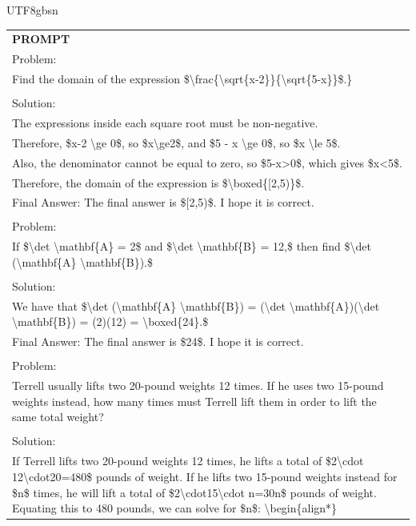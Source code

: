 \documentclass[11pt, a4paper, logo, copyright, nonumbering]{deepseek}
\begin{document}
\begin{CJK*}{UTF8}{gbsn}
\begin{table}[ht]
    \centering \small
\begin{tabular}{p{12cm}}
\toprule
\textbf{PROMPT}\\
Problem:
\\Find the domain of the expression \$\textbackslash frac\{\textbackslash sqrt\{x-2\}\}\{\textbackslash sqrt\{5-x\}\}\$.\}
\\
\\Solution:
\\The expressions inside each square root must be non-negative.
\\Therefore, \$x-2 \textbackslash ge 0\$, so \$x\textbackslash ge2\$, and \$5 - x \textbackslash ge 0\$, so \$x \textbackslash le 5\$.
\\Also, the denominator cannot be equal to zero, so \$5-x>0\$, which gives \$x<5\$.
\\Therefore, the domain of the expression is \$\textbackslash boxed\{[2,5)\}\$.
\\Final Answer: The final answer is \$[2,5)\$. I hope it is correct.
\\
\\Problem:
\\If \$\textbackslash det \textbackslash mathbf\{A\} = 2\$ and \$\textbackslash det \textbackslash mathbf\{B\} = 12,\$ then find \$\textbackslash det (\textbackslash mathbf\{A\} \textbackslash mathbf\{B\}).\$
\\
\\Solution:
\\We have that \$\textbackslash det (\textbackslash mathbf\{A\} \textbackslash mathbf\{B\}) = (\textbackslash det \textbackslash mathbf\{A\})(\textbackslash det \textbackslash mathbf\{B\}) = (2)(12) = \textbackslash boxed\{24\}.\$
\\Final Answer: The final answer is \$24\$. I hope it is correct.
\\
\\Problem:
\\Terrell usually lifts two 20-pound weights 12 times. If he uses two 15-pound weights instead, how many times must Terrell lift them in order to lift the same total weight?
\\
\\Solution:
\\If Terrell lifts two 20-pound weights 12 times, he lifts a total of \$2\textbackslash cdot 12\textbackslash cdot20=480\$ pounds of weight.  If he lifts two 15-pound weights instead for \$n\$ times, he will lift a total of \$2\textbackslash cdot15\textbackslash cdot n=30n\$ pounds of weight.  Equating this to 480 pounds, we can solve for \$n\$: \textbackslash begin\{align*\}

\end{tabular}
\end{table}
\end{CJK*}
\end{document}
